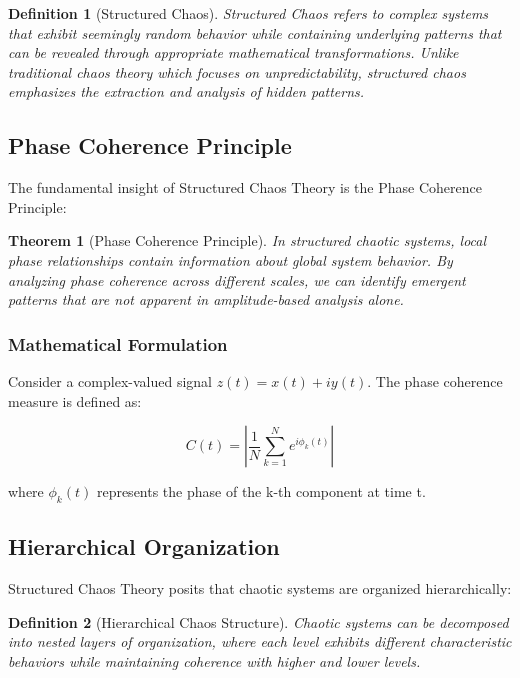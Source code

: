 \documentclass[12pt]{article}
\newtheorem{theorem}{Theorem}
\newtheorem{definition}{Definition}
\begin{document}
\begin{definition}[Structured Chaos]
Structured Chaos refers to complex systems that exhibit seemingly random behavior while containing underlying patterns that can be revealed through appropriate mathematical transformations. Unlike traditional chaos theory which focuses on unpredictability, structured chaos emphasizes the extraction and analysis of hidden patterns.
\end{definition}

\subsection{Phase Coherence Principle}

The fundamental insight of Structured Chaos Theory is the Phase Coherence Principle:

\begin{theorem}[Phase Coherence Principle]
In structured chaotic systems, local phase relationships contain information about global system behavior. By analyzing phase coherence across different scales, we can identify emergent patterns that are not apparent in amplitude-based analysis alone.
\end{theorem}

\subsubsection{Mathematical Formulation}

Consider a complex-valued signal $z(t) = x(t) + iy(t)$. The phase coherence measure is defined as:

\begin{equation}
C(t) = \left| \frac{1}{N} \sum_{k=1}^N e^{i\phi_k(t)} \right|
\end{equation}

where $\phi_k(t)$ represents the phase of the k-th component at time t.

\subsection{Hierarchical Organization}

Structured Chaos Theory posits that chaotic systems are organized hierarchically:

\begin{definition}[Hierarchical Chaos Structure]
Chaotic systems can be decomposed into nested layers of organization, where each level exhibits different characteristic behaviors while maintaining coherence with higher and lower levels.
\end{definition}
\end{document}

